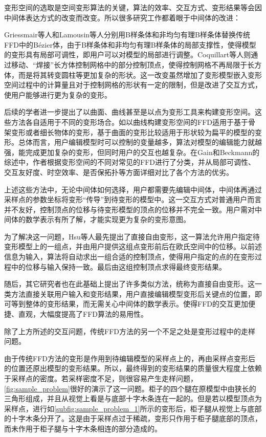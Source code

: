     变形空间的选取是空间变形算法的关键，算法的效率、交互方式、变形结果等会因中间体表达方式的改变而改变。所以很多研究工作都着眼于中间体的改进：

    Griessmair等人\cite{Griessmair89}和Lamousin等人\cite{lamousin1994}分别用B样条体和非均匀有理B样条体替换传统FFD\cite{Sederberg86}中的Bézier体，由于B样条体和非均匀有理B样条体的局部支撑性，使得模型的变形具有局部可调性，即用户可以对模型的局部进行调整。Coquillart等人\cite{coquillart1990}则通过移动、“焊接”长方体控制网格中的部分控制顶点，使得控制网格不再局限于长方体，而是将其转变圆柱等更加复杂的形状。这一改变虽然增加了变形模型嵌入变形空间过程中的计算量且对于控制网格的形状有一定的限制，但是改进了交互方式，使用户能够进行更为复杂的变形。

    后续的学者进一步提出了以曲面\cite{feng1996, decaudin1996}、曲线\cite{lazarus1994axial, chang1994generalized}甚至是以点\cite{moccozet1997dirichlet, borrel1994simple}为变形工具来构建变形空间。这些方法各自适用于不同的变形场合。如以曲线构建变形空间的FFD适用于基于骨架变形或者细长物体的变形，基于曲面的变形比较适用于形状较为扁平的模型的变形。总体而言，用户编辑模型时可以控制的变量越多，算法对模型的编辑能力就越强，能完成更加复杂的变形，但同时用户的交互也越复杂。在Gain和Beckmann的综述中，作者根据变形空间的不同对常见的FFD进行了分类，并从局部可调性、交互友好度、时空效率、是否保拓扑等方面详细对比了各个方法的优劣\cite{Gain08}。

    上述这些方法中，无论中间体如何选择，用户都需要先编辑中间体，中间体再通过采样点的参数坐标将变形“传导”到待变形的模型中。这一交互方式对普通用户而言并不友好，控制顶点的位移与待变形模型的顶点的位移并不完全一致。用户需对中间体的数学表示有所了解，才能实现更为复杂的变形意图。

    为了解决这一问题，Hsu等人最先提出了直接自由变形\cite{hsu1992}，这一算法允许用户指定待变形模型上的一组点，并由用户提供这组点变形前后在欧氏空间中的位移。以前述信息为输入，算法将自动求出一组合适的控制顶点，使得用户指定的点的在变形过程中的位移与输入保持一致。最后由这组控制顶点求得最终变形结果。

    随后，其它研究者也在此基础上提出了许多类似方法，统称为直接自由变形。这一类方法直接关联用户输入和变形结果，用户直接编辑模型变形后关键点的位置，即可等到整体的变形结果，而无需关心中间体的数学表示。使得FFD的交互更加便捷、直观，大幅度提高了FFD算法的易用性。

    除了上方所述的交互问题，传统FFD方法的另一个不足之处是变形过程中的走样问题。

    由于传统FFD方法的变形是作用到待编辑模型的采样点上的，再由采样点变形后的位置还原出模型的变形结果。所以，最终得到的变形结果的质量很大程度上依赖于采样点的密度。若采样密度不足，则很容易产生走样问题，\autoref{fig:sample_problem}很好的演示了这一问题。柜子的四个腿在原模型中由狭长的三角形组成，并且从视觉上看是与底部十字木条连在一起的。但是若以模型顶点为采样点，进行如\autoref{subfig:sample_problem_1}所示的变形后，柜子腿从视觉上与底部的十字木条分开了。这是由于采样点过于稀疏，变形只作用于柜子腿底部的顶点，而未作用于柜子腿与十字木条相连的部分造成的。


